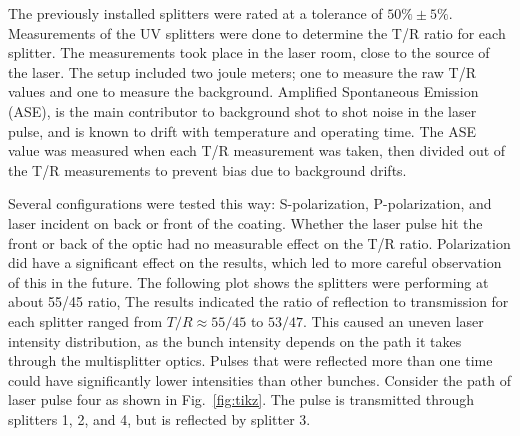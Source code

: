 \documentclass{iitthesis}
\begin{document}
The previously installed splitters were rated at a tolerance of $50\%\pm5\%$.
Measurements of the UV splitters were done to determine the T/R ratio for 
each splitter. The measurements took place in the laser room, close to the source of the laser.
The setup included two joule meters; one to measure the raw T/R values and one to measure 
the background. Amplified Spontaneous Emission (ASE), 
is the main contributor to background shot to shot noise in the laser pulse,
and is known to drift with temperature and operating time. 
The ASE value was measured when each T/R measurement was taken, then divided out of the T/R 
measurements to prevent bias due to background drifts. 

Several configurations were tested this way: S-polarization, P-polarization, 
and laser incident on back or front of the coating. 
Whether the laser pulse hit the front or back of the optic
had no measurable effect on the T/R ratio. Polarization did have a significant effect on
the results, which led to more careful observation of this in the future.
The following plot shows the splitters were performing at about 55/45 ratio, 
The results indicated the ratio of reflection to transmission for each splitter ranged from 
$T/R\approx55/45$ to $53/47$. 
This caused an uneven laser intensity distribution, as the bunch intensity depends on the path 
it takes through the multisplitter optics. Pulses that were reflected more than one
time could have significantly lower intensities than other bunches. 
Consider the path of laser pulse four as shown in Fig.~\ref{fig:tikz}. 
The pulse is transmitted through splitters 1, 2, and 4, but is reflected by splitter 3.
\def \delayvertical {1.5}
\def \delayoneleft {7.5}
\def \delaytworight{15}
\def \mycenter{10.0}
\def \labels{6.5}
\def \sone {-0.5}
\def \stwo {\sone+1.5}
\def \sthree {\stwo+1.5}
\def \sfour {\sthree+1.5}
\def \buffer{-4.5}
\end{document}
